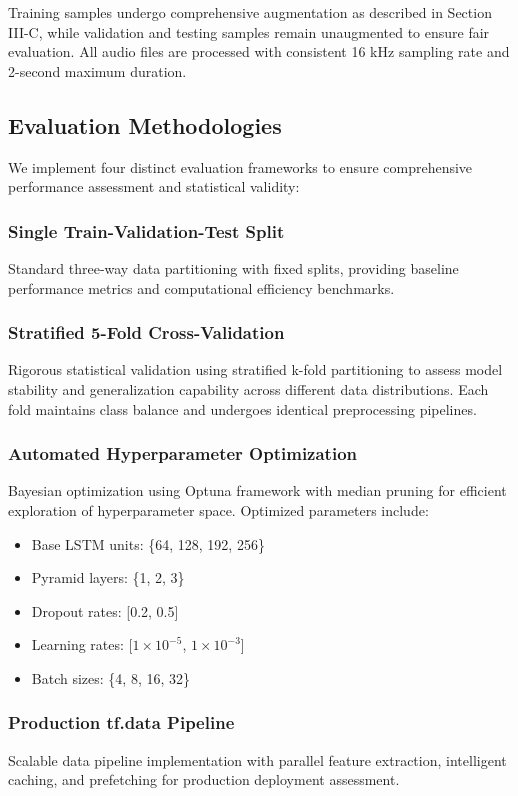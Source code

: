 \documentclass[conference]{IEEEtran}
\begin{document}
Training samples undergo comprehensive augmentation as described in Section III-C, while validation and testing samples remain unaugmented to ensure fair evaluation. All audio files are processed with consistent 16 kHz sampling rate and 2-second maximum duration.

\subsection{Evaluation Methodologies}

We implement four distinct evaluation frameworks to ensure comprehensive performance assessment and statistical validity:

\subsubsection{Single Train-Validation-Test Split}
Standard three-way data partitioning with fixed splits, providing baseline performance metrics and computational efficiency benchmarks.

\subsubsection{Stratified 5-Fold Cross-Validation}  
Rigorous statistical validation using stratified k-fold partitioning to assess model stability and generalization capability across different data distributions. Each fold maintains class balance and undergoes identical preprocessing pipelines.

\subsubsection{Automated Hyperparameter Optimization}
Bayesian optimization using Optuna \cite{akiba2019optuna} framework with median pruning for efficient exploration of hyperparameter space. Optimized parameters include:
\begin{itemize}
\item Base LSTM units: \{64, 128, 192, 256\}
\item Pyramid layers: \{1, 2, 3\}  
\item Dropout rates: [0.2, 0.5]
\item Learning rates: [$1 \times 10^{-5}$, $1 \times 10^{-3}$]
\item Batch sizes: \{4, 8, 16, 32\}
\end{itemize}

\subsubsection{Production tf.data Pipeline}
Scalable data pipeline implementation with parallel feature extraction, intelligent caching, and prefetching for production deployment assessment.
\end{document}
